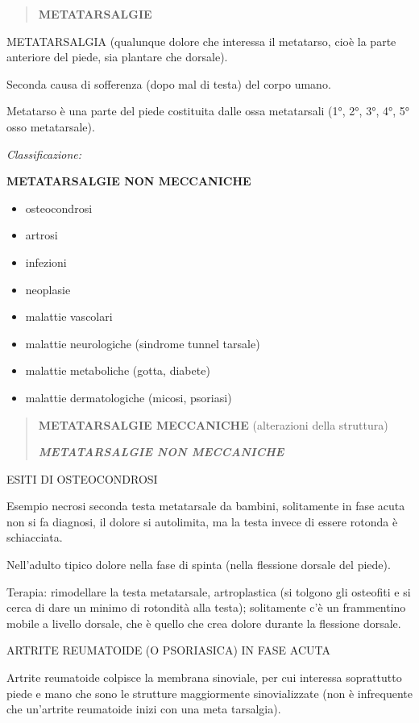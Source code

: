 \documentclass[]{article}
\begin{document}
\begin{quote}
\textbf{METATARSALGIE}
\end{quote}

METATARSALGIA (qualunque dolore che interessa il metatarso, cioè la
parte anteriore del piede, sia plantare che dorsale).

Seconda causa di sofferenza (dopo mal di testa) del corpo umano.

Metatarso è una parte del piede costituita dalle ossa metatarsali (1°,
2°, 3°, 4°, 5° osso metatarsale).

\emph{Classificazione:}

\textbf{METATARSALGIE NON MECCANICHE}

\begin{itemize}
\item
  osteocondrosi
\item
  artrosi
\item
  infezioni
\item
  neoplasie
\item
  malattie vascolari
\item
  malattie neurologiche (sindrome tunnel tarsale)
\item
  malattie metaboliche (gotta, diabete)
\item
  malattie dermatologiche (micosi, psoriasi)
\end{itemize}

\begin{quote}
\textbf{METATARSALGIE MECCANICHE} (alterazioni della struttura)

\textbf{\emph{METATARSALGIE NON MECCANICHE}}
\end{quote}

ESITI DI OSTEOCONDROSI

Esempio necrosi seconda testa metatarsale da bambini, solitamente in
fase acuta non si fa diagnosi, il dolore si autolimita, ma la testa
invece di essere rotonda è schiacciata.

Nell'adulto tipico dolore nella fase di spinta (nella flessione dorsale
del piede).

Terapia: rimodellare la testa metatarsale, artroplastica (si tolgono gli
osteofiti e si cerca di dare un minimo di rotondità alla testa);
solitamente c'è un frammentino mobile a livello dorsale, che è quello
che crea dolore durante la flessione dorsale.

ARTRITE REUMATOIDE (O PSORIASICA) IN FASE ACUTA

Artrite reumatoide colpisce la membrana sinoviale, per cui interessa
soprattutto piede e mano che sono le strutture maggiormente
sinovializzate (non è infrequente che un'artrite reumatoide inizi con
una meta tarsalgia).
\end{document}
